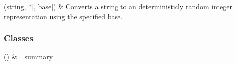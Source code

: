 \documentclass[letterpaper,10pt,english]{sphinxmanual}
\begin{document}
\begin{savenotes}\sphinxattablestart
\sphinxthistablewithglobalstyle
\sphinxthistablewithnovlinesstyle
\centering
\begin{tabulary}{\linewidth}[t]{}
\sphinxtoprule
\sphinxtableatstartofbodyhook
\sphinxAtStartPar
{\hyperref[\detokenize{generated/eflatun_uav.number_generators:eflatun_uav.number_generators.convert_string_to_int}]{}}(string, *{[}, base{]})
&
\sphinxAtStartPar
Converts a string to an deterministicly random integer representation using the specified base.
\\
\sphinxbottomrule
\end{tabulary}
\sphinxtableafterendhook\par
\sphinxattableend\end{savenotes}
\subsubsection*{Classes}


\begin{savenotes}\sphinxattablestart
\sphinxthistablewithglobalstyle
\sphinxthistablewithnovlinesstyle
\centering
\begin{tabulary}{\linewidth}[t]{}
\sphinxtoprule
\sphinxtableatstartofbodyhook
\sphinxAtStartPar
{\hyperref[\detokenize{generated/eflatun_uav.number_generators:eflatun_uav.number_generators.TesterClass}]{}}()
&
\sphinxAtStartPar
\_summary\_
\\
\sphinxbottomrule
\end{tabulary}
\sphinxtableafterendhook\par
\sphinxattableend\end{savenotes}
\end{document}
